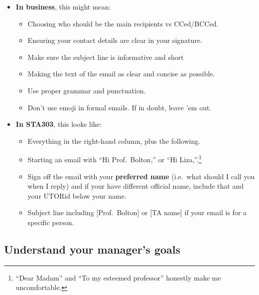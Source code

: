 \documentclass[
  openany]{book}
\providecommand{\tightlist}{%
  \setlength{\itemsep}{0pt}\setlength{\parskip}{0pt}}
\begin{document}
\begin{itemize}
\tightlist
\item
  \textbf{In business}, this might mean:

  \begin{itemize}
  \tightlist
  \item
    Choosing who should be the main recipients vs CCed/BCCed.
  \item
    Ensuring your contact details are clear in your signature.
  \item
    Make sure the subject line is informative and short
  \item
    Making the text of the email as clear and concise as possible.
  \item
    Use proper grammar and punctuation.
  \item
    Don't use emoji in formal emails. If in doubt, leave 'em out.
  \end{itemize}
\item
  \textbf{In STA303}, this looks like:

  \begin{itemize}
  \tightlist
  \item
    Everything in the right-hand column, plus the following.
  \item
    Starting an email with ``Hi Prof.~Bolton,'' or ``Hi Liza,''.\footnote{``Dear Madam'' and ``To my esteemed professor'' honestly make me uncomfortable.}
  \item
    Sign off the email with your \textbf{preferred name} (i.e.~what should I call you when I reply) and if your have different official name, include that and your UTORid below your name.
  \item
    Subject line including {[}Prof.~Bolton{]} or {[}TA name{]} if your email is for a specific person.
  \end{itemize}
\end{itemize}

\hypertarget{understand-your-managers-goals}{%
\subsection{Understand your manager's goals}\label{understand-your-managers-goals}}
\end{document}
